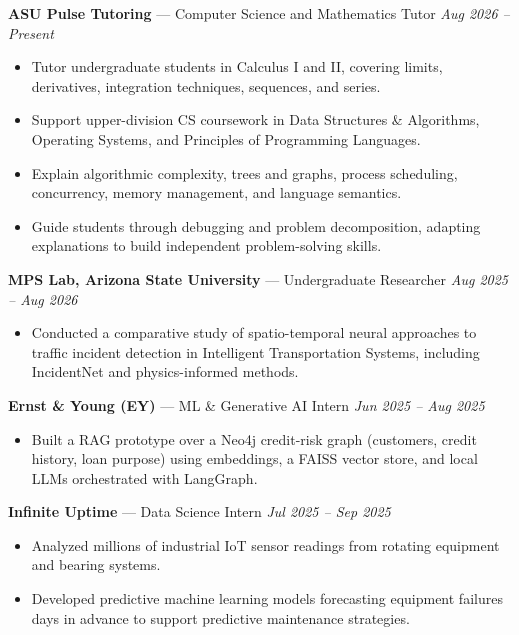 \documentclass[a4paper,8pt]{extarticle}
\begin{document}
\noindent
\textbf{ASU Pulse Tutoring} --- Computer Science and Mathematics Tutor
\hfill \textit{Aug 2026 -- Present}

\begin{itemize}
\item Tutor undergraduate students in Calculus I and II, covering limits, derivatives, integration techniques, sequences, and series.
\item Support upper-division CS coursework in Data Structures \& Algorithms, Operating Systems, and Principles of Programming Languages.
\item Explain algorithmic complexity, trees and graphs, process scheduling, concurrency, memory management, and language semantics.
\item Guide students through debugging and problem decomposition, adapting explanations to build independent problem-solving skills.
\end{itemize}

\noindent
\textbf{MPS Lab, Arizona State University} --- Undergraduate Researcher
\hfill \textit{Aug 2025 -- Aug 2026}

\begin{itemize}
\item Conducted a comparative study of spatio-temporal neural approaches to traffic incident detection in Intelligent Transportation Systems, including IncidentNet and physics-informed methods.
\end{itemize}

\noindent
\textbf{Ernst \& Young (EY)} --- ML \& Generative AI Intern
\hfill \textit{Jun 2025 -- Aug 2025}

\begin{itemize}
\item Built a RAG prototype over a Neo4j credit-risk graph (customers, credit history, loan purpose) using embeddings, a FAISS vector store, and local LLMs orchestrated with LangGraph.
\end{itemize}

\noindent
\textbf{Infinite Uptime} --- Data Science Intern
\hfill \textit{Jul 2025 -- Sep 2025}

\begin{itemize}
\item Analyzed millions of industrial IoT sensor readings from rotating equipment and bearing systems.
\item Developed predictive machine learning models forecasting equipment failures days in advance to support predictive maintenance strategies.
\end{itemize}
\end{document}

